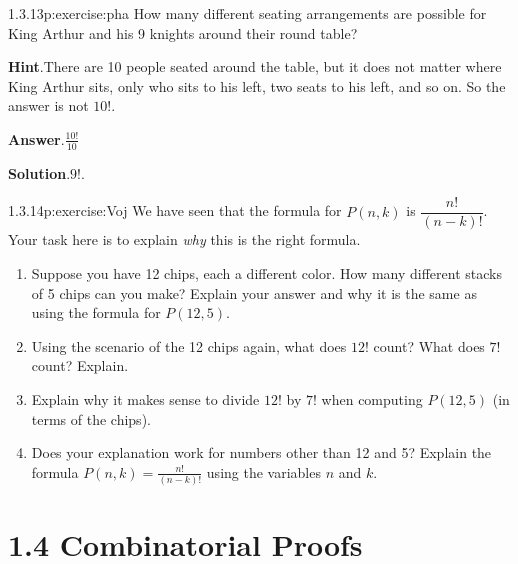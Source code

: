 \documentclass[twoside,11pt,]{book}
\newcommand{\blocktitlefont}{\relax}
\numberwithin{equation}{chapter}
\begin{document}
\begin{divisionsolution}{1.3.13}{}{p:exercise:pha}%
How many different seating arrangements are possible for King Arthur and his 9 knights around their round table?%
\par\smallskip%
\noindent\textbf{\blocktitlefont Hint}.\quad{}There are 10 people seated around the table, but it does not matter where King Arthur sits, only who sits to his left, two seats to his left, and so on.  So the answer is not \(10!\text{.}\)%
\par\smallskip%
\noindent\textbf{\blocktitlefont Answer}.\quad{}\(\frac{10!}{10}\)%
\par\smallskip%
\noindent\textbf{\blocktitlefont Solution}.\quad{}\(9!\text{.}\)%
\end{divisionsolution}%
\begin{divisionsolution}{1.3.14}{}{p:exercise:Voj}%
We have seen that the formula for \(P(n,k)\) is \(\dfrac{n!}{(n-k)!}\). Your task here is to explain \emph{why} this is the right formula.%
\begin{enumerate}[label=(\alph*)]
\item{}Suppose you have 12 chips, each a different color. How many different stacks of 5 chips can you make? Explain your answer and why it is the same as using the formula for \(P(12,5)\). %
\item{}Using the scenario of the 12 chips again, what does \(12!\) count? What does \(7!\) count? Explain. %
\item{}Explain why it makes sense to divide \(12!\) by \(7!\) when computing \(P(12,5)\) (in terms of the chips).%
\item{}Does your explanation work for numbers other than 12 and 5? Explain the formula \(P(n,k) = \frac{n!}{(n-k)!}\) using the variables \(n\) and \(k\). %
\end{enumerate}
%
\end{divisionsolution}%
\section*{1.4 Combinatorial Proofs}
\end{document}
